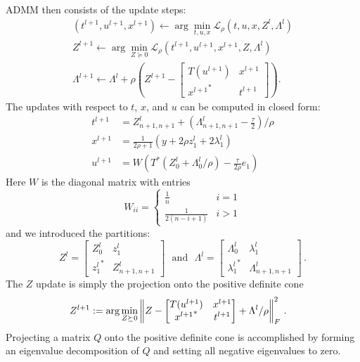 ADMM then consists of the update steps:
\begin{align*}
(t^{l+1},u^{l+1},x^{l+1})  \leftarrow \arg\min_{t,u,x} \mathcal{L}_\rho(t,u,x,Z^l, \Lambda^l) \\
Z^{l+1}  \leftarrow \arg\min_{Z\succeq 0}  \mathcal{L}_\rho(t^{l+1},u^{l+1},x^{l+1}, Z, \Lambda^l ) \\
\Lambda^{l+1}  \leftarrow \Lambda^l + \rho  \left( Z^{l+1}-\begin{bmatrix}
  T(u^{l+1}) &  x^{l+1} \\
  {x^{l+1}}^* & t^{l+1}
 \end{bmatrix} \right).
\end{align*}
The updates with respect to $t$, $x$, and $u$ can be computed in closed form:
\begin{align*}
    t^{l+1} &= Z_{n+1,n+1}^l+\left(\Lambda_{n+1,n+1}^l-\frac{\tau}{2}\right)/\rho\\
	 x^{l+1} &= \frac{1}{2\rho+1}(y  + 2\rho z_1^{l} + 2\lambda_1^l)\\
    u^{l+1} &= W \left(T^*(Z_0^l+ \Lambda_0^l/\rho) - \frac{\tau }{2\rho} {e}_1\right)
\end{align*}
Here $W$ is the diagonal matrix with entries
\[
	W_{ii} = \begin{cases} 
		\frac{1}{n} & i=1\\
		\frac{1}{2(n-i+1)} & i>1
	\end{cases}
\]
and we introduced the partitions:
\[
	Z^l = \begin{bmatrix} Z_0^l & z_1^l \\ {z_1^l}^* & Z^l_{n+1,n+1} \end{bmatrix} ~~~\mbox{and}~~~
	\Lambda^l = \begin{bmatrix} \Lambda_0^l & \lambda_1^l \\ {\lambda_1^l}^* & \Lambda^l_{n+1,n+1} \end{bmatrix}\,.
\]
The $Z$ update is simply the projection onto the positive definite cone
\begin{equation}\label{eq:z-step}
\hspace{-.3cm}Z^{l+1}:=	 \arg\min_{Z\succeq 0} \left\|Z-\begin{bmatrix}
  T(u^{l+1}) &  x^{l+1} \\
   {x^{l+1}}^* & t^{l+1}
 \end{bmatrix}+\Lambda^{l}/\rho\right\|_F^2\,.
\end{equation}
Projecting a matrix $Q$ onto the positive definite cone is accomplished by
forming an eigenvalue decomposition of $Q$ and setting all negative eigenvalues
to zero.

